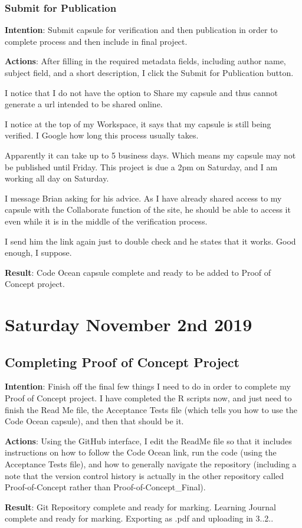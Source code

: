 \documentclass{article}
\begin{document}
\subsubsection{Submit for Publication}

\textbf{Intention}: Submit capsule for verification and then publication in order to complete process and then include in final project.

\textbf{Actions}: After filling in the required metadata fields, including author name, subject field, and a short description, I click the Submit for Publication button.

{\item I notice that I do not have the option to Share my capsule and thus cannot generate a url intended to be shared online.
\item I notice at the top of my Workspace, it says that my capsule is still being verified. I Google how long this process usually takes.
\item Apparently it can take up to 5 business days. Which means my capsule may not be published until Friday. This project is due a 2pm on Saturday, and I am working all day on Saturday.
\item I message Brian asking for his advice. As I have already shared access to my capsule with the Collaborate function of the site, he should be able to access it even while it is in the middle of the verification process.
\item I send him the link again just to double check and he states that it works. Good enough, I suppose.}

\textbf{Result}: Code Ocean capsule complete and ready to be added to Proof of Concept project.

\section{Saturday November 2nd 2019}

\subsection{Completing Proof of Concept Project}

\textbf{Intention}: Finish off the final few things I need to do in order to complete my Proof of Concept project. I have completed the R scripts now, and just need to finish the Read Me file, the Acceptance Tests file (which tells you how to use the Code Ocean capsule), and then that should be it.

\textbf{Actions}: Using the GitHub interface, I edit the ReadMe file so that it includes instructions on how to follow the Code Ocean link, run the code (using the Acceptance Tests file), and how to generally navigate the repository (including a note that the version control history is actually in the other repository called Proof-of-Concept rather than Proof-of-Concept\_Final).

\textbf{Result}: Git Repository complete and ready for marking. Learning Journal complete and ready for marking. Exporting as .pdf and uploading in 3..2..
\end{document}
